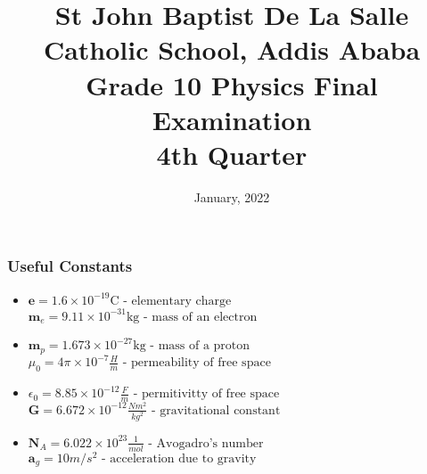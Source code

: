\documentclass[13pt,addpoints]{exam}
\date{January, 2022}\usepackage{geometry}
\begin{document}
	\title{St John Baptist De La Salle Catholic School, Addis Ababa\\
		\large Grade 10 Physics Final Examination \\
		4th Quarter}
	\maketitle
	\begin{center}
		\subsubsection*{Useful Constants}
		\begin{itemize}
			\item $\textbf{e}=1.6\times10^{-19}\text{C}\text{  - elementary charge}$ \textbf{~}  $\textbf{m}_e=9.11\times10^{-31}\text{kg}\text{  - mass of an electron}$
			\item $\textbf{m}_p=1.673\times10^{-27}\text{kg}\text{  - mass of a proton}$ \textbf{~}$\mu_0=4\pi\times10^{-7}\frac{H}{m}\text{  - permeability of free space}$
			\item $\epsilon_0=8.85\times10^{-12}\frac{F}{m}\text{  - permitivitty of free space}$\textbf{~}$\textbf{G} = 6.672\times10^{-12}\frac{Nm^2}{kg^2}\text{  - gravitational constant}$
			\item $\textbf{N}_A = 6.022\times10^{23}\frac{1}{mol}\text{  - Avogadro's number}$$\textbf{~}$$\textbf{a}_g=10m/s^2\text{  - acceleration due to gravity}$
		\end{itemize}
	\end{center}
\end{document}
